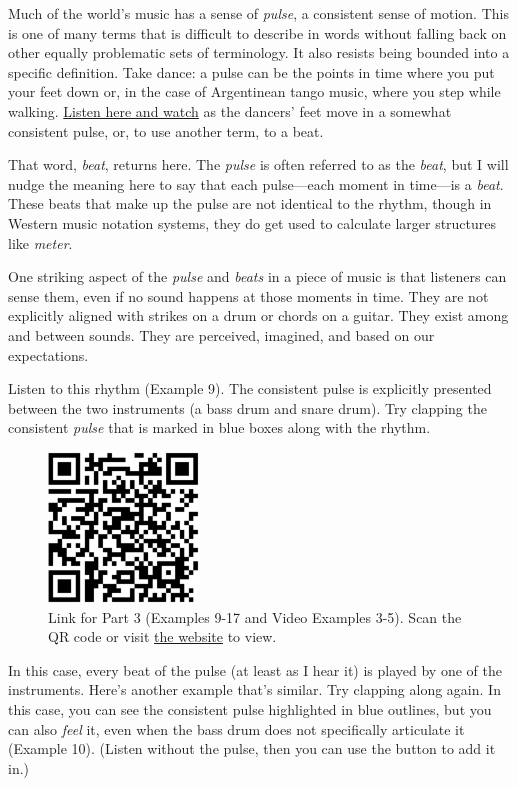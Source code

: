 \documentclass[twoside]{article}
\providecommand{\wmturlcaption}{
  Scan the QR code or visit \href{https://worldmusictextbook.org/witulski-2021}{the website} to view.
}
\begin{document}
Much of the world's music has a sense of \emph{pulse}, a consistent
sense of motion. This is one of many terms that is difficult to describe
in words without falling back on other equally problematic sets of
terminology. It also resists being bounded into a specific definition.
Take dance: a pulse can be the points in time where you put your feet
down or, in the case of Argentinean tango music, where you step while
walking. \href{https://www.youtube.com/embed/wIvfPI_GT3U}{Listen here
and watch} as the dancers' feet move in a somewhat consistent pulse, or,
to use another term, to a beat.

That word, \emph{beat}, returns here. The \emph{pulse} is often referred
to as the \emph{beat}, but I will nudge the meaning here to say that
each pulse---each moment in time---is a \emph{beat}. These beats that
make up the pulse are not identical to the rhythm, though in Western
music notation systems, they do get used to calculate larger structures
like \emph{meter}.

One striking aspect of the \emph{pulse} and \emph{beats} in a piece of
music is that listeners can sense them, even if no sound happens at
those moments in time. They are not explicitly aligned with strikes on a
drum or chords on a guitar. They exist among and between sounds. They
are perceived, imagined, and based on our expectations.

Listen to this rhythm (Example 9). The consistent pulse is explicitly presented
between the two instruments (a bass drum and snare drum). Try clapping
the consistent \emph{pulse} that is marked in blue boxes along with the
rhythm.

\begin{figure}
  \centering
  \includegraphics[height=4cm]{witulski-rhythm-part-3.png}
  \caption*{Link for Part 3 (Examples 9-17 and Video Examples 3-5). \wmturlcaption}
\end{figure}

In this case, every beat of the pulse (at least as I hear it) is played
by one of the instruments. Here's another example that's similar. Try
clapping along again. In this case, you can see the consistent pulse
highlighted in blue outlines, but you can also \emph{feel} it, even when
the bass drum does not specifically articulate it (Example 10). (Listen without the
pulse, then you can use the button to add it in.)
\end{document}
